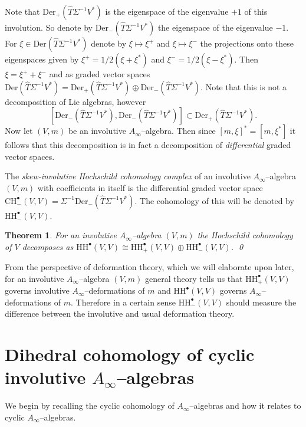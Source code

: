 \documentclass[british]{amsart}
\theoremstyle{plain}
\newtheorem{theorem}{Theorem}[section]
\theoremstyle{definition}
{
\newaliascnt{{definition}}{theorem}\newtheorem{{definition}}[{definition}]{{Definition}}\aliascntresetthe{{definition}}\expandafterautorefname\endcsname{{Definition}}}
{
\newaliascnt{{remark}}{theorem}\newtheorem{{remark}}[{remark}]{{Remark}}\aliascntresetthe{{remark}}\expandafterautorefname\endcsname{{Remark}}}
{
\newaliascnt{{example}}{theorem}\newtheorem{{example}}[{example}]{{Example}}\aliascntresetthe{{example}}\expandafterautorefname\endcsname{{Example}}}
{
\newaliascnt{{examples}}{theorem}\newtheorem{{examples}}[{examples}]{{Examples}}\aliascntresetthe{{examples}}\expandafterautorefname\endcsname{{Examples}}}
{
\newaliascnt{{notation}}{theorem}\newtheorem{{notation}}[{notation}]{{Notation}}\aliascntresetthe{{notation}}\expandafterautorefname\endcsname{{Notation}}}
{
\newaliascnt{{convention}}{theorem}\newtheorem{{convention}}[{convention}]{{Convention}}\aliascntresetthe{{convention}}\expandafterautorefname\endcsname{{Convention}}}
\numberwithin{equation}{section}
\numberwithin{figure}{section}
\begin{document}
Note that ${\mathrm{Der}}_+(\widehat{T}\Sigma^{-1}V^*)$ is the eigenspace of the eigenvalue $+1$ of this involution. So denote by ${\mathrm{Der}}_-(\widehat{T}\Sigma^{-1}V^*)$ the eigenspace of the eigenvalue $-1$. For $\xi\in{\mathrm{Der}}(\widehat{T}\Sigma^{-1}V^*)$ denote by $\xi\mapsto\xi^+$ and $\xi\mapsto\xi^-$ the projections onto these eigenspaces given by $\xi^+ = 1/2(\xi+\xi^*)$ and $\xi^- = 1/2(\xi - \xi^*)$. Then $\xi=\xi^+ + \xi^-$ and as graded vector spaces ${\mathrm{Der}}(\widehat{T}\Sigma^{-1}V^*)={\mathrm{Der}}_+(\widehat{T}\Sigma^{-1}V^*)\oplus {\mathrm{Der}}_-(\widehat{T}\Sigma^{-1}V^*)$. Note that this is not a decomposition of Lie algebras, however
\[
[{\mathrm{Der}}_-(\widehat{T}\Sigma^{-1}V^*),{\mathrm{Der}}_-(\widehat{T}\Sigma^{-1}V^*)] \subset {\mathrm{Der}}_+(\widehat{T}\Sigma^{-1}V^*).
\]
Now let $(V,m)$ be an involutive $A_\infty$--algebra. Then since $[m,\xi]^* = [m,\xi^*]$ it follows that this decomposition is in fact a decomposition of \emph{differential} graded vector spaces.

\begin{definition}
The \emph{skew-involutive Hochschild cohomology complex} of an involutive $A_\infty$--algebra $(V,m)$ with coefficients in itself is the differential graded vector space ${\mathrm{CH}}^{\bullet}_-(V,V) = \Sigma^{-1}{\mathrm{Der}}_-(\widehat{T}\Sigma^{-1}V^*)$. The cohomology of this will be denoted by ${\mathrm{HH}}^{\bullet}_-(V,V)$.
\end{definition}

\begin{theorem}\label{thm:hochschilddecomposition}
For an involutive $A_\infty$--algebra $(V,m)$ the Hochschild cohomology of $V$ decomposes as ${\mathrm{HH}}^\bullet(V,V)\cong {\mathrm{HH}}^{\bullet}_+(V,V)\oplus{\mathrm{HH}}^{\bullet}_-(V,V)$.
\qed
\end{theorem}

\begin{remark}
From the perspective of deformation theory, which we will elaborate upon later, for an involutive $A_\infty$--algebra $(V,m)$ general theory tells us that ${\mathrm{HH}}_+^\bullet(V,V)$ governs involutive $A_\infty$--deformations of $m$ and ${\mathrm{HH}}^\bullet(V,V)$ governs $A_\infty$--deformations of $m$. Therefore in a certain sense ${\mathrm{HH}}_-^\bullet(V,V)$ should measure the difference between the involutive and usual deformation theory.
\end{remark}

\section{Dihedral cohomology of cyclic involutive \texorpdfstring{$A_\infty$--}{A-infinity }algebras}\label{sec:cyc}
We begin by recalling the cyclic cohomology of $A_\infty$--algebras and how it relates to cyclic $A_\infty$--algebras.
\end{document}
